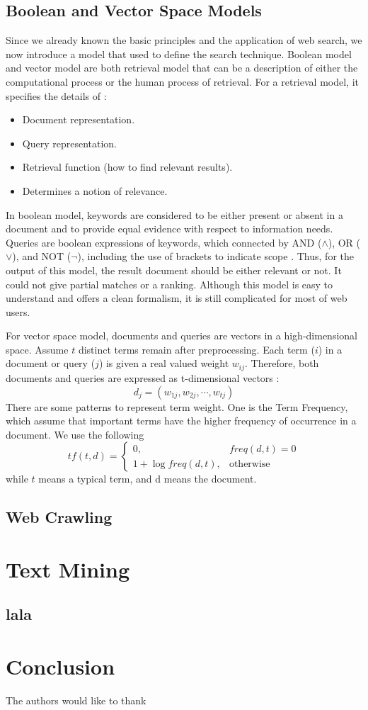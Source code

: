 \documentclass[sigconf]{acmart}
\begin{document}
\subsection{Boolean and Vector Space Models}
Since we already known the basic principles and the application of web search, we now introduce a model that used to define the search technique. Boolean model and vector model are both retrieval model that can be a description of either the computational process or the human process of retrieval. For a retrieval model, it specifies the details of \cite{editor07}: 
\begin{itemize}
\item Document representation.
\item Query representation.
\item Retrieval function (how to find relevant results).
\item Determines a notion of relevance.
\end{itemize}  

In boolean model, keywords are considered to be either present or absent in a
document and to provide equal evidence with respect to information needs. Queries are boolean expressions of keywords, which connected by AND ($\wedge$), OR ($\vee$), and NOT ($\neg$), including the use of brackets to indicate scope \cite{editor07}. Thus, for the output of this model, the result document should be either relevant or not. It could not give partial matches or a ranking. Although this model is easy to understand and offers a clean formalism, it is still complicated for most of web users.

For vector space model, documents and queries are vectors in a high-dimensional space. Assume $t$ distinct terms remain after preprocessing. Each term ($i$) in a document or query ($j$) is given a real valued weight $w_{ij}$. Therefore, both documents and queries are expressed as t-dimensional vectors \cite{editor07}:
\[d_j=(w_{1j},w_{2j},\cdots,w_{tj})\]
There are some patterns to represent term weight. One is the Term Frequency, which assume that important terms have the higher frequency of occurrence in a document. We use the following 
\[tf(t,d)=
  \begin{cases}
    0, & freq(d,t)=0 \\
    1+\log{freq(d,t)}, & \text{otherwise}
  \end{cases}
\]
while $t$ means a typical term, and d means the document.


\subsection{Web Crawling}
\section{Text Mining}
\subsection{lala}

\section{Conclusion}

\begin{acks}

  The authors would like to thank 

\end{acks}


 
\end{document}
